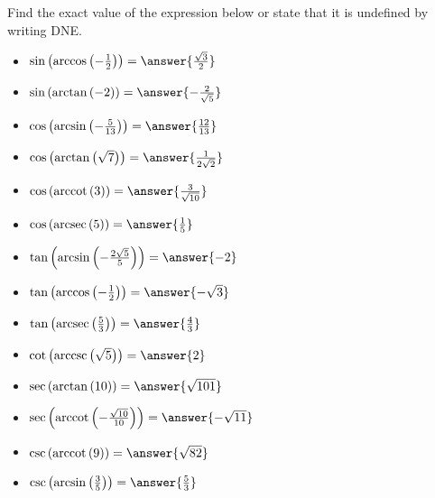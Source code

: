 \documentclass{ximera}
\author{Carl Stitz \and Jeff Zeager \and Bart Snapp \and Matthew Carr}
\begin{document}
\begin{exercise}
Find the exact value of the expression below or state that it is undefined by writing DNE.
\begin{itemize}
\item  $\sin\left(\arccos\left(-\frac{1}{2}\right)\right)=\answer{\frac{\sqrt{3}}{2}}$ 
\item  $\sin\left(\arctan\left(-2\right)\right)=\answer{-\frac{2}{\sqrt{5}}}$ 
\item  $\cos\left(\arcsin\left(-\frac{5}{13}\right)\right)=\answer{\frac{12}{13}}$
\item  $\cos\left(\arctan\left(\sqrt{7} \right)\right)=\answer{\frac{1}{2\sqrt{2}}}$
\item  $\cos\left(\text{arccot}\left( 3 \right)\right)=\answer{\frac{3}{\sqrt{10}}}$
\item  $\cos\left(\text{arcsec}\left( 5 \right)\right)=\answer{\frac{1}{5}}$
\item  $\tan\left(\arcsin\left(-\frac{2\sqrt{5}}{5}\right)\right)=\answer{-2}$
\item  $\tan\left(\arccos\left(-\frac{1}{2}\right)\right)=\answer{-\sqrt{3}}$ 
\item  $\tan\left(\text{arcsec}\left(\frac{5}{3}\right)\right)=\answer{\frac{4}{3}}$ 
\item  $\cot\left(\text{arccsc}\left(\sqrt{5}\right)\right)=\answer{2}$ 
\item  $\sec\left(\arctan\left(10\right)\right)=\answer{\sqrt{101}}$ 
\item  $\sec\left(\text{arccot}\left(-\frac{\sqrt{10}}{10}\right)\right)=\answer{-\sqrt{11}}$
\item  $\csc\left(\text{arccot}\left(9 \right)\right)=\answer{\sqrt{82}}$ 
\item  $\csc\left(\arcsin\left(\frac{3}{5}\right)\right)=\answer{\frac{5}{3}}$
\end{itemize}


\end{exercise}
\end{document}
